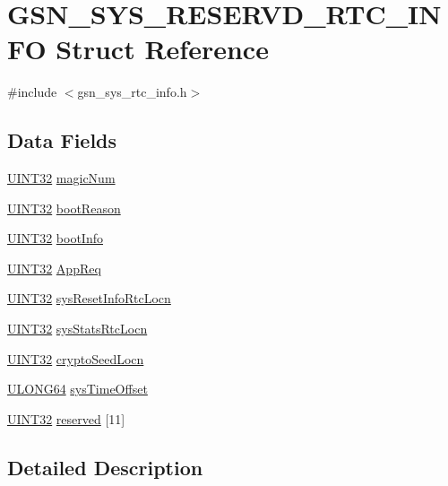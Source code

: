 \hypertarget{a00255}{
\section{GSN\_\-SYS\_\-RESERVD\_\-RTC\_\-INFO Struct Reference}
\label{a00255}
}


{\ttfamily \#include $<$gsn\_\-sys\_\-rtc\_\-info.h$>$}

\subsection*{Data Fields}
\begin{DoxyCompactItemize}
\item 
\hyperlink{a00660_gae1e6edbbc26d6fbc71a90190d0266018}{UINT32} \hyperlink{a00255_a6193bbc3d016048a8231b0ff2571f6d7}{magicNum}
\item 
\hyperlink{a00660_gae1e6edbbc26d6fbc71a90190d0266018}{UINT32} \hyperlink{a00255_a81df1b1a967faea76636f64e7ebf3f4e}{bootReason}
\item 
\hyperlink{a00660_gae1e6edbbc26d6fbc71a90190d0266018}{UINT32} \hyperlink{a00255_ae8ac19e848b6f3c171282a0d39f082c5}{bootInfo}
\item 
\hyperlink{a00660_gae1e6edbbc26d6fbc71a90190d0266018}{UINT32} \hyperlink{a00255_a9c0ac1a01533f2ce85b1565883a3480b}{AppReq}
\item 
\hyperlink{a00660_gae1e6edbbc26d6fbc71a90190d0266018}{UINT32} \hyperlink{a00255_abcb215deb500d73ccf5760cab85861fc}{sysResetInfoRtcLocn}
\item 
\hyperlink{a00660_gae1e6edbbc26d6fbc71a90190d0266018}{UINT32} \hyperlink{a00255_abeec99e8f7edd0f9634f81a6e0b162a3}{sysStatsRtcLocn}
\item 
\hyperlink{a00660_gae1e6edbbc26d6fbc71a90190d0266018}{UINT32} \hyperlink{a00255_a9ad02aaef6e1e772e96c824033ba84c4}{cryptoSeedLocn}
\item 
\hyperlink{a00660_ga28961430434ccabca6862ea93fe9a15b}{ULONG64} \hyperlink{a00255_ac97bc115dc1489ee62b582fc0672ded0}{sysTimeOffset}
\item 
\hyperlink{a00660_gae1e6edbbc26d6fbc71a90190d0266018}{UINT32} \hyperlink{a00255_acb5e37a8a1273a562eecbebd47708b75}{reserved} \mbox{[}11\mbox{]}
\end{DoxyCompactItemize}


\subsection{Detailed Description}


